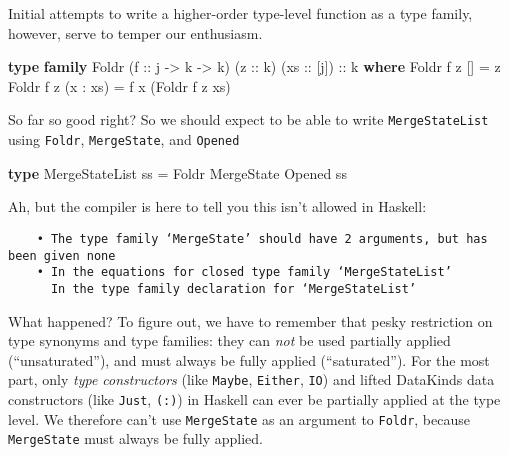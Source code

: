 \documentclass[]{article}
\newenvironment{Shaded}{}{}
\newcommand{\DataTypeTok}[1]{\textcolor[rgb]{0.56,0.13,0.00}{#1}}
\newcommand{\KeywordTok}[1]{\textcolor[rgb]{0.00,0.44,0.13}{\textbf{#1}}}
\newcommand{\NormalTok}[1]{#1}
\newcommand{\OperatorTok}[1]{\textcolor[rgb]{0.40,0.40,0.40}{#1}}
\newcommand{\OtherTok}[1]{\textcolor[rgb]{0.00,0.44,0.13}{#1}}
\begin{document}
Initial attempts to write a higher-order type-level function as a type family,
however, serve to temper our enthusiasm.

\begin{Shaded}
\begin{Highlighting}[]
\KeywordTok{type} \KeywordTok{family} \DataTypeTok{Foldr}\NormalTok{ (}\OtherTok{f ::}\NormalTok{ j }\OtherTok{{-}\textgreater{}}\NormalTok{ k }\OtherTok{{-}\textgreater{}}\NormalTok{ k) (}\OtherTok{z ::}\NormalTok{ k) (}\OtherTok{xs ::}\NormalTok{ [j])}\OtherTok{ ::}\NormalTok{ k }\KeywordTok{where}
    \DataTypeTok{Foldr}\NormalTok{ f z \textquotesingle{}[]       }\OtherTok{=}\NormalTok{ z}
    \DataTypeTok{Foldr}\NormalTok{ f z (x \textquotesingle{}}\OperatorTok{:}\NormalTok{ xs) }\OtherTok{=}\NormalTok{ f x (}\DataTypeTok{Foldr}\NormalTok{ f z xs)}
\end{Highlighting}
\end{Shaded}

So far so good right? So we should expect to be able to write
\texttt{MergeStateList} using \texttt{Foldr}, \texttt{MergeState}, and
\texttt{\textquotesingle{}Opened}

\begin{Shaded}
\begin{Highlighting}[]
\KeywordTok{type} \DataTypeTok{MergeStateList}\NormalTok{ ss }\OtherTok{=} \DataTypeTok{Foldr} \DataTypeTok{MergeState} \DataTypeTok{\textquotesingle{}Opened}\NormalTok{ ss}
\end{Highlighting}
\end{Shaded}

Ah, but the compiler is here to tell you this isn't allowed in Haskell:

\begin{verbatim}
    • The type family ‘MergeState’ should have 2 arguments, but has been given none
    • In the equations for closed type family ‘MergeStateList’
      In the type family declaration for ‘MergeStateList’
\end{verbatim}

What happened? To figure out, we have to remember that pesky restriction on type
synonyms and type families: they can \emph{not} be used partially applied
(``unsaturated''), and must always be fully applied (``saturated''). For the
most part, only \emph{type constructors} (like \texttt{Maybe}, \texttt{Either},
\texttt{IO}) and lifted DataKinds data constructors (like
\texttt{\textquotesingle{}Just}, \texttt{\textquotesingle{}(:)}) in Haskell can
ever be partially applied at the type level. We therefore can't use
\texttt{MergeState} as an argument to \texttt{Foldr}, because
\texttt{MergeState} must always be fully applied.
\end{document}
